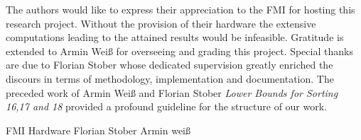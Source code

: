 \documentclass[10pt,journal,compsoc]{IEEEtran}
\begin{document}
The authors would like to express their appreciation to the FMI for hosting this research project. 
Without the provision of their hardware the extensive computations leading to the attained results would be infeasible.
Gratitude is extended to Armin Weiß for overseeing and grading this project. 
Special thanks are due to Florian Stober whose dedicated supervision greatly enriched the discours in terms of methodology, implementation and documentation.
The preceded work of Armin Weiß and Florian Stober \textit{Lower Bounds for Sorting 16,17 and 18} provided a profound guideline for the structure of our work.

FMI
Hardware
Florian Stober
Armin weiß

\ifCLASSOPTIONcaptionsoff
  \newpage
\fi




\end{document}
